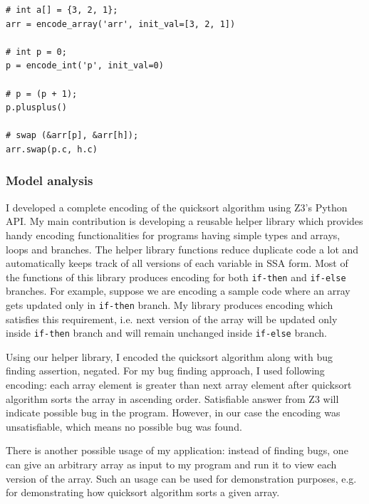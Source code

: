 \documentclass{sig-alternate-05-2015}
\begin{document}


\begin{lstlisting}[caption={Sample library usage for encoding common programming functionalities}, label={lst:bfeatures}]
# int a[] = {3, 2, 1};
arr = encode_array('arr', init_val=[3, 2, 1])

# int p = 0;
p = encode_int('p', init_val=0)

# p = (p + 1);
p.plusplus()

# swap (&arr[p], &arr[h]);
arr.swap(p.c, h.c)
\end{lstlisting}

\subsubsection{Model analysis}

I developed a complete encoding of the quicksort algorithm using Z3's Python API. My main 
contribution is developing a reusable helper library which provides handy encoding 
functionalities for programs having simple types and arrays, loops and branches. The helper 
library functions reduce duplicate code a lot and automatically keeps track of all 
versions of each variable in SSA form. Most of the functions of this library produces 
encoding for both \texttt{if-then} and \texttt{if-else} branches. For example, suppose we 
are encoding a sample code where an array gets updated only in \texttt{if-then} branch. My 
library produces encoding which satisfies this requirement, i.e. next version of the 
array will be updated only inside \texttt{if-then} branch and will remain unchanged inside 
\texttt{if-else} branch.

Using our helper library, I encoded the quicksort algorithm along with bug finding assertion, 
negated. For my bug finding approach, I used following encoding: each array element is greater 
than next array element after quicksort algorithm sorts the array in ascending order. Satisfiable 
answer from Z3 will indicate possible bug in the program. However, in our case the encoding was 
unsatisfiable, which means no possible bug was found. 

There is another possible usage of my application: instead of finding bugs, one can give an arbitrary array 
as input to my program and run it to view each version of the array. Such an usage 
can be used for demonstration purposes, e.g. for demonstrating how quicksort algorithm sorts a given array.
\end{document}
